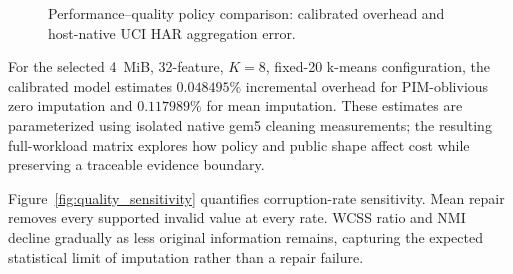 \documentclass[conference]{IEEEtran}
\begin{document}
\begin{figure}[t]
\centering
{}
\caption{Performance--quality policy comparison: calibrated overhead and
host-native UCI HAR aggregation error.}
\label{fig:pim_cleaning}
\end{figure}

For the selected 4~MiB, 32-feature, $K=8$, fixed-20 k-means configuration,
the calibrated model estimates $0.048495\%$ incremental overhead for
PIM-oblivious zero imputation and $0.117989\%$ for mean imputation. These
estimates are parameterized using isolated native gem5 cleaning measurements;
the resulting full-workload matrix explores how policy and public shape affect
cost while preserving a traceable evidence boundary.

Figure~\ref{fig:quality_sensitivity} quantifies corruption-rate sensitivity.
Mean repair removes every supported invalid value at every rate. WCSS ratio and
NMI decline gradually as less original information remains, capturing the
expected statistical limit of imputation rather than a repair failure.
\end{document}
